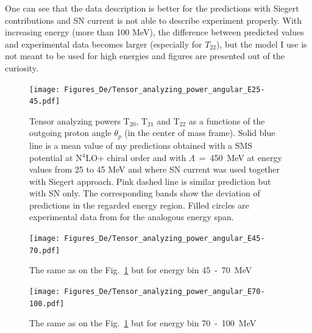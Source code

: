     One can see that the data description is better for the predictions with Siegert contributions 
    and SN current is not able to describe experiment properly. With increasing energy 
    (more than 100 MeV),
    the difference between predicted values and experimental data becomes larger
    (especially for $T_{22}$), but the model I use is not meant to be used for high energies 
    and figures are presented out of the curiosity. 
    




    \begin{figure}[h]
        \begin{center}
        \texttt{[image: Figures\_De/Tensor\_analyzing\_power\_angular\_E25-45.pdf]}
        \end{center}
        \caption{Tensor analyzing powers T$_{20}$, T$_{21}$ and T$_{22}$ as a functions of the
        outgoing proton angle $\theta_p$ (in the center of mass frame).
        Solid blue line is a mean value of my predictions obtained with a
        SMS potential at N$^4$LO+ chiral order and with $\Lambda$~=~450~MeV
        at energy values from 25 to 45 MeV and
        where SN current was used together with Siegert approach. 
        Pink dashed line is similar prediction but with SN only. 
        The corresponding bands show the deviation of predictions in the regarded
        energy region.
        Filled circles are experimental data
        from \cite{rachek2007} for the analogous energy span.}
        \label{tensor_angular_25-45}
    \end{figure}

    \begin{figure}[h]
        \begin{center}
        \texttt{[image: Figures\_De/Tensor\_analyzing\_power\_angular\_E45-70.pdf]}
        \end{center}
        \caption{The same as on the Fig.~\ref*{tensor_angular_25-45} but for energy bin 45~-~70~MeV}
        \label{tensor_angular_45-70}
    \end{figure}

    \begin{figure}[h]
        \begin{center}
        \texttt{[image: Figures\_De/Tensor\_analyzing\_power\_angular\_E70-100.pdf]}
        \end{center}
        \caption{The same as on the Fig.~\ref*{tensor_angular_25-45} but for energy bin 70~-~100~MeV}
        \label{tensor_angular_70-100}
    \end{figure}        

